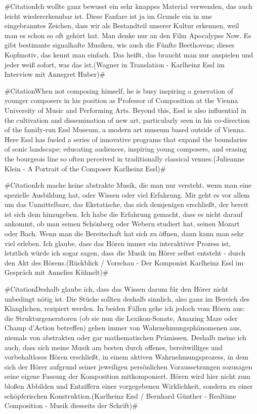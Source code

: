 \documentclass[a4paper,12pt]{article}
\newcommand{\zitat}[2]{\#Citation#1(#2)\#}
\begin{document}
\zitat{Ich wollte ganz bewusst ein sehr knappes Material verwenden, das auch leicht wiedererkennbar ist. Diese Fanfare ist ja im Grunde ein in uns eingebranntes Zeichen, dass wir als Bestandteil unserer Kultur erkennen, weil man es schon so oft gehört hat. Man denke nur an den Film Apocalypse Now. Es gibt bestimmte signalhafte Musiken, wie auch die Fünfte Beethovens; dieses Kopfmotiv, das kennt man einfach. Das heißt, das braucht man nur anspielen und jeder weiß sofort, was das ist.}
{Wagner in Translation - Karlheinz Essl im Interview mit Annegret Huber}

\zitat{When not composing himself, he is busy inspiring a generation of younger composers in his position as Professor of Composition at the Vienna University of Music and Performing Arts. Beyond this, Essl is also influential in the cultivation and dissemination of new art, particularly seen in his co-direction of the family-run Essl Museum, a modern art museum based outside of Vienna. Here Essl has fueled a series of innovative programs that expand the boundaries of sonic landscape; educating audiences, inspiring young composers, and erasing the bourgeois line so often perceived in traditionally classical venues.}
{Julieanne Klein - A Portrait of the Composer Karlheinz Essl}

\zitat{Ich mache keine abstrakte Musik, die man nur versteht, wenn man eine spezielle Ausbildung hat, oder Wissen oder viel Erfahrung. Mir geht es vor allem um das Unmittelbare, das Ekstatische, das sich demjenigen erschließt, der bereit ist sich dem hinzugeben. Ich habe die Erfahrung gemacht, dass es nicht darauf ankommt, ob man seinen Schönberg oder Webern studiert hat, seinen Mozart oder Bach. Wenn man die Bereitschaft hat sich zu öffnen, dann kann man sehr viel erleben. Ich glaube, dass das Hören immer ein interaktiver Prozess ist, letztlich würde ich sogar sagen, dass die Musik im Hörer selbst entsteht - durch den Akt des Hörens.}
{Rückblick / Vorschau - Der Komponist Karlheinz Essl im Gespräch mit Annelies Kühnelt}

\zitat{Deshalb glaube ich, dass das Wissen darum für den Hörer nicht unbedingt nötig ist. Die Stücke sollten deshalb sinnlich, also ganz im Bereich des Klanglichen, rezipiert werden. In beiden Fällen gehe ich jedoch vom Hören aus: die Strukturgeneratoren (ob sie nun die Lexikon-Sonate, Amazing Maze oder Champ d'Action betreffen) gehen immer von Wahrnehmungsphänomenen aus, niemals von abstrakten oder gar mathematischen Prämissen. Deshalb meine ich auch, dass sich meine Musik am besten durch offenes, bereitwilliges und vorbehaltloses Hören erschließt, in einem aktiven Wahrnehmungsprozess, in dem sich der Hörer aufgrund seiner jeweiligen persönlichen Voraussetzungen sozusagen seine eigene Fassung der Komposition mitkomponiert. Hören wird hier nicht zum bloßen Abbilden und Entziffern einer vorgegebenen Wirklichkeit, sondern zu einer schöpferischen Konstruktion.}
{Karlheinz Essl / Bernhard Günther - Realtime Composition - Musik diesseits der Schrift}
\end{document}
